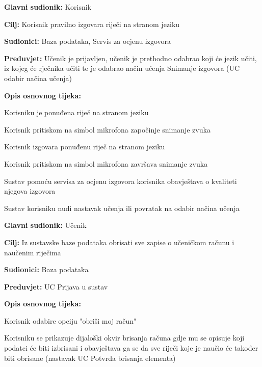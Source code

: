 \noindent {}
\begin{packed_item}

	\item \textbf{Glavni sudionik: } Korisnik
	\item \textbf{Cilj: } Korisnik pravilno izgovara riječi na stranom jeziku
	\item \textbf{Sudionici: } Baza podataka, Servis za ocjenu izgovora
	\item \textbf{Preduvjet: } Učenik je prijavljen, učenik je prethodno odabrao koji će jezik učiti, iz kojeg će rječnika učiti te je odabrao način učenja Snimanje izgovora (UC odabir načina učenja)
	\item  \textbf{Opis osnovnog tijeka:} 
	
	\item[] \begin{packed_enum}

		\item Korisniku je ponuđena riječ na stranom jeziku
		\item Korisnik pritiskom na simbol mikrofona započinje snimanje zvuka
		\item Korisnik izgovara ponuđenu riječ na stranom jeziku
		\item Korisnik pritiskom na simbol mikrofona završava snimanje zvuka
		\item Sustav pomoću servisa za ocjenu izgovora korisnika obavještava o kvaliteti njegova izgovora
		\item Sustav korisniku nudi nastavak učenja ili povratak na odabir načina učenja

	\end{packed_enum}

\end{packed_item}


\noindent {}
\begin{packed_item}

	\item \textbf{Glavni sudionik: } Učenik
	\item \textbf{Cilj: } Iz sustavske baze podataka obrisati sve zapise o 
	učeničkom računu i naučenim riječima
	\item \textbf{Sudionici: } Baza podataka
	\item \textbf{Preduvjet: } UC Prijava u sustav
	\item  \textbf{Opis osnovnog tijeka:} 
	
	\item[] \begin{packed_enum}

		\item Korisnik odabire opciju "obriši moj račun"
		\item Korisniku se prikazuje dijaloški okvir brisanja računa gdje mu se opisuje koji podatci će biti izbrisani i obavještava ga se da sve riječi koje je naučio će također biti obrisane (nastavak UC Potvrda brisanja elementa)
	
	\end{packed_enum}

\end{packed_item}

